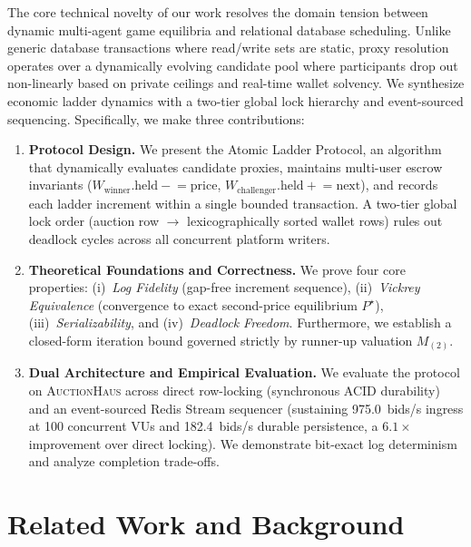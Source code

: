 \documentclass[conference]{IEEEtran}
\begin{document}
The core technical novelty of our work resolves the domain tension between dynamic
multi-agent game equilibria and relational database scheduling. Unlike generic database
transactions where read/write sets are static, proxy resolution operates over a dynamically
evolving candidate pool where participants drop out non-linearly based on private ceilings
and real-time wallet solvency. We synthesize economic ladder dynamics with a two-tier
global lock hierarchy and event-sourced sequencing. Specifically, we make three contributions:
\begin{enumerate}
  \item \textbf{Protocol Design.} We present the Atomic Ladder Protocol, an algorithm
    that dynamically evaluates candidate proxies, maintains multi-user escrow invariants
    ($W_{\text{winner}}.\text{held} \mathrel{-}= \text{price}$, $W_{\text{challenger}}.\text{held} \mathrel{+}= \text{next}$),
    and records each ladder increment within a single bounded transaction. A two-tier
    global lock order (auction row $\to$ lexicographically sorted wallet rows) rules
    out deadlock cycles across all concurrent platform writers.
  \item \textbf{Theoretical Foundations and Correctness.} We prove four core properties:
    (i)~\emph{Log Fidelity} (gap-free increment sequence), (ii)~\emph{Vickrey Equivalence}
    (convergence to exact second-price equilibrium $P^\star$), (iii)~\emph{Serializability},
    and (iv)~\emph{Deadlock Freedom}. Furthermore, we establish a closed-form iteration
    bound governed strictly by runner-up valuation $M_{(2)}$.
  \item \textbf{Dual Architecture and Empirical Evaluation.} We evaluate the protocol on
    \textsc{AuctionHaus} across direct row-locking (synchronous ACID durability) and an
    event-sourced Redis Stream sequencer (sustaining 975.0~bids/s ingress at 100 concurrent
    VUs and 182.4~bids/s durable persistence, a $6.1\times$ improvement over direct locking).
    We demonstrate bit-exact log determinism and analyze completion trade-offs.
\end{enumerate}

\section{Related Work and Background}
\end{document}
